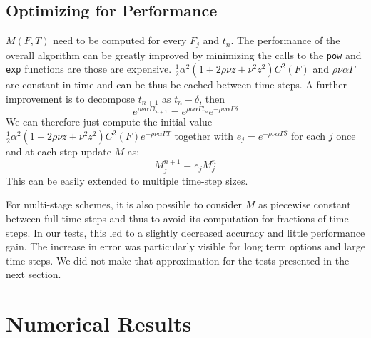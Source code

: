 \documentclass[]{rAMF2e}
\begin{document}
\subsection{Optimizing for Performance}
$M(F,T)$ need to be computed for every $F_j$ and $t_n$. The performance of the overall algorithm can be greatly improved by minimizing the calls to the \texttt{pow} and \texttt{exp} functions are those are expensive. $\frac{1}{2} \alpha^2 (1+2\rho\nu z+ \nu^2 z^2) C^2(F)$ and $\rho\nu\alpha\Gamma$ are constant in time and can be thus be cached between time-steps. A further improvement is to decompose $t_{n+1}$ as $t_{n}-\delta$, then 
\begin{equation}
e^{\rho\nu\alpha\Gamma t_{n+1}}=e^{\rho\nu\alpha\Gamma t_n}e^{-\rho\nu\alpha\Gamma \delta}
\end{equation}
We can therefore just compute the initial value $\frac{1}{2} \alpha^2 (1+2\rho\nu z+ \nu^2 z^2) C^2(F)e^{-\rho\nu\alpha\Gamma T}$ together with $e_j = e^{-\rho\nu\alpha\Gamma \delta}$ for each $j$ once and at each step update $M$ as:
\begin{equation}
M_j^{n+1} =e_j M_j^{n} 
\end{equation}
This can be easily extended to multiple time-step sizes.

For multi-stage schemes, it is also possible to consider $M$ as piecewise constant between full time-steps and thus to avoid its computation for fractions of time-steps. In our tests, this led to a slightly decreased accuracy and little performance gain. The increase in error was particularly visible for long term options and large time-steps. We did not make that approximation for the tests presented in the next section.

\section{Numerical Results}
\end{document}
